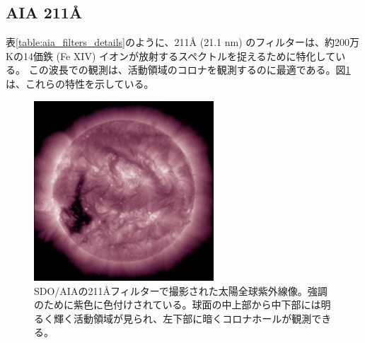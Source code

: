 \subsection{AIA 211Å}
    表\ref{table:aia_filters_details}のように、211Å (21.1 nm) のフィルターは、約200万Kの14価鉄 (Fe XIV) イオンが放射するスペクトルを捉えるために特化している。
    この波長での観測は、活動領域のコロナを観測するのに最適である。図\ref{fig:sample_aia211}は、これらの特性を示している。
    \begin{figure}[h]
        \centering
        \includegraphics[width=0.6\textwidth]{figures/data/latest_256_0211.jpg}
        \caption{SDO/AIAの211Åフィルターで撮影された太陽全球紫外線像。強調のために紫色に色付けされている。球面の中上部から中下部には明るく輝く活動領域が見られ、左下部に暗くコロナホールが観測できる。}
        \label{fig:sample_aia211}
    \end{figure}

